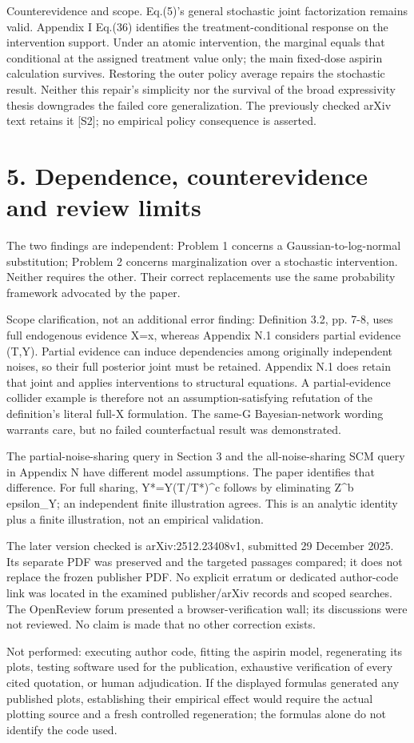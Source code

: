 \documentclass[10pt]{article}
\begin{document}
Counterevidence and scope. Eq.(5)’s general stochastic joint factorization remains valid. Appendix I Eq.(36) identifies the treatment-conditional response on the intervention support. Under an atomic intervention, the marginal equals that conditional at the assigned treatment value only; the main fixed-dose aspirin calculation survives. Restoring the outer policy average repairs the stochastic result. Neither this repair’s simplicity nor the survival of the broad expressivity thesis downgrades the failed core generalization. The previously checked arXiv text retains it [S2]; no empirical policy consequence is asserted.\par
\section*{5. Dependence, counterevidence and review limits}
The two findings are independent: Problem 1 concerns a Gaussian-to-log-normal substitution; Problem 2 concerns marginalization over a stochastic intervention. Neither requires the other. Their correct replacements use the same probability framework advocated by the paper.\par
Scope clarification, not an additional error finding: Definition 3.2, pp. 7-8, uses full endogenous evidence X=x, whereas Appendix N.1 considers partial evidence (T,Y). Partial evidence can induce dependencies among originally independent noises, so their full posterior joint must be retained. Appendix N.1 does retain that joint and applies interventions to structural equations. A partial-evidence collider example is therefore not an assumption-satisfying refutation of the definition’s literal full-X formulation. The same-G Bayesian-network wording warrants care, but no failed counterfactual result was demonstrated.\par
The partial-noise-sharing query in Section 3 and the all-noise-sharing SCM query in Appendix N have different model assumptions. The paper identifies that difference. For full sharing, Y*=Y(T/T*)\textasciicircum{}c follows by eliminating Z\textasciicircum{}b epsilon\_Y; an independent finite illustration agrees. This is an analytic identity plus a finite illustration, not an empirical validation.\par
The later version checked is arXiv:2512.23408v1, submitted 29 December 2025. Its separate PDF was preserved and the targeted passages compared; it does not replace the frozen publisher PDF. No explicit erratum or dedicated author-code link was located in the examined publisher/arXiv records and scoped searches. The OpenReview forum presented a browser-verification wall; its discussions were not reviewed. No claim is made that no other correction exists.\par
Not performed: executing author code, fitting the aspirin model, regenerating its plots, testing software used for the publication, exhaustive verification of every cited quotation, or human adjudication. If the displayed formulas generated any published plots, establishing their empirical effect would require the actual plotting source and a fresh controlled regeneration; the formulas alone do not identify the code used.\par
\end{document}
